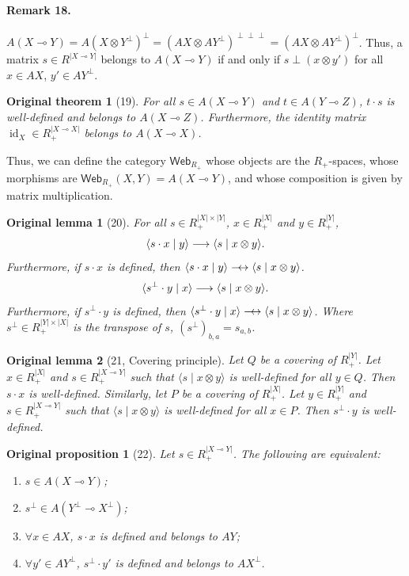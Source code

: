 \documentclass[10pt,a4paper]{article}
\newcommand{\lolli}{\multimap}
\newcommand{\Web}{\mathsf{Web}}
\newcommand{\id}{\operatorname{id}}
\newcommand{\dimp}{\mathrel{\relbar\joinrel\rightarrow}}
\newcommand{\dequiv}{\mathrel{\relbar\joinrel\leftrightarrow}}
\newcommand{\scalar}[2]{\langle #1\mid #2\rangle}
\newtheorem*{originallemma}{Original lemma}
\newtheorem*{originalprop}{Original proposition}
\newtheorem*{originalthm}{Original theorem}
\begin{document}
\paragraph{Remark 18.} $A(X\lolli Y)=A(X\otimes Y^\perp)^\perp=(AX\otimes AY^\perp)^{\perp\perp\perp}=(AX\otimes AY^\perp)^\perp$. Thus, a matrix $s\in R^{|X\lolli Y|}$ belongs to $A(X\lolli Y)$ if and only if $s\perp(x\otimes y')$ for all $x\in AX$, $y'\in AY^\perp$.
\begin{originalthm}[19] For all $s\in A(X\lolli Y)$ and $t\in A(Y\lolli Z)$, $t\cdot s$ is well-defined and belongs to $A(X\lolli Z)$. Furthermore, the identity matrix $\id_X\in R_+^{|X\lolli X|}$ belongs to $A(X\lolli X)$.\end{originalthm}
Thus, we can define the category $\Web_{R_+}$ whose objects are the $R_+$-spaces, whose morphisms are $\Web_{R_+}(X,Y)=A(X\lolli Y)$, and whose composition is given by matrix multiplication.
\begin{originallemma}[20] For all $s\in R_+^{|X|\times|Y|}$, $x\in R_+^{|X|}$ and $y\in R_+^{|Y|}$,
\[\scalar{s\cdot x}{y}\dimp\scalar{s}{x\otimes y}.\]
Furthermore, if $s\cdot x$ is defined, then $\scalar{s\cdot x}{y}\dequiv\scalar{s}{x\otimes y}$.
\[\scalar{s^\perp\cdot y}{x}\dimp\scalar{s}{x\otimes y}.\]
Furthermore, if $s^\perp\cdot y$ is defined, then $\scalar{s^\perp\cdot y}{x}\dequiv\scalar{s}{x\otimes y}$. Where $s^\perp\in R_+^{|Y|\times|X|}$ is the transpose of $s$, $(s^\perp)_{b,a}=s_{a,b}$.
\end{originallemma}
\begin{originallemma}[21, Covering principle] Let $Q$ be a covering of $R_+^{|Y|}$. Let $x\in R_+^{|X|}$ and $s\in R_+^{|X\lolli Y|}$ such that $\scalar{s}{x\otimes y}$ is well-defined for all $y\in Q$. Then $s\cdot x$ is well-defined. Similarly, let $P$ be a covering of $R_+^{|X|}$. Let $y\in R_+^{|Y|}$ and $s\in R_+^{|X\lolli Y|}$ such that $\scalar{s}{x\otimes y}$ is well-defined for all $x\in P$. Then $s^\perp\cdot y$ is well-defined.\end{originallemma}
\begin{originalprop}[22] Let $s\in R_+^{|X\lolli Y|}$. The following are equivalent:
\begin{enumerate}\item $s\in A(X\lolli Y)$;\item $s^\perp\in A(Y^\perp\lolli X^\perp)$;\item $\forall x\in AX$, $s\cdot x$ is defined and belongs to $AY$;\item $\forall y'\in AY^\perp$, $s^\perp\cdot y'$ is defined and belongs to $AX^\perp$.\end{enumerate}
\end{originalprop}
\end{document}
